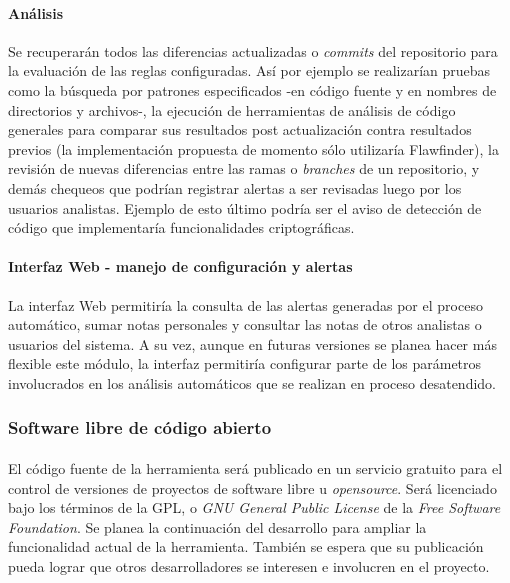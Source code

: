 \documentclass[11pt,a4paper]{article}
\begin{document}
\paragraph{Análisis} Se recuperarán todos las diferencias actualizadas o \textit{commits} del repositorio para la evaluación de las reglas configuradas. Así por ejemplo se realizarían pruebas como la búsqueda por patrones especificados -en código fuente y en nombres de directorios y archivos-, la ejecución de herramientas de análisis de código generales para comparar sus resultados post actualización contra resultados previos (la implementación propuesta de momento sólo utilizaría Flawfinder), la revisión de nuevas diferencias entre las ramas o \textit{branches} de un repositorio, y demás chequeos que podrían registrar alertas a ser revisadas luego por los usuarios analistas. Ejemplo de esto último podría ser el aviso de detección de código que implementaría funcionalidades criptográficas.
\\

\paragraph{Interfaz Web - manejo de configuración y alertas} La interfaz Web permitiría la consulta de las alertas generadas por el proceso automático, sumar notas personales y consultar las notas de otros analistas o usuarios del sistema. A su vez, aunque en futuras versiones se planea hacer más flexible este módulo, la interfaz permitiría configurar parte de los parámetros involucrados en los análisis automáticos que se realizan en proceso desatendido.
\\

\subsubsection{Software libre de código abierto}

\paragraph{}El código fuente de la herramienta será publicado en un servicio gratuito para el control de versiones de proyectos de software libre u \textit{opensource}. Será licenciado bajo los términos de la GPL, o \textit{GNU General Public License} de la \textit{Free Software Foundation}. Se planea la continuación del desarrollo para ampliar la funcionalidad actual de la herramienta. También se espera que su publicación pueda lograr que otros desarrolladores se interesen e involucren en el proyecto.
\\
\end{document}

